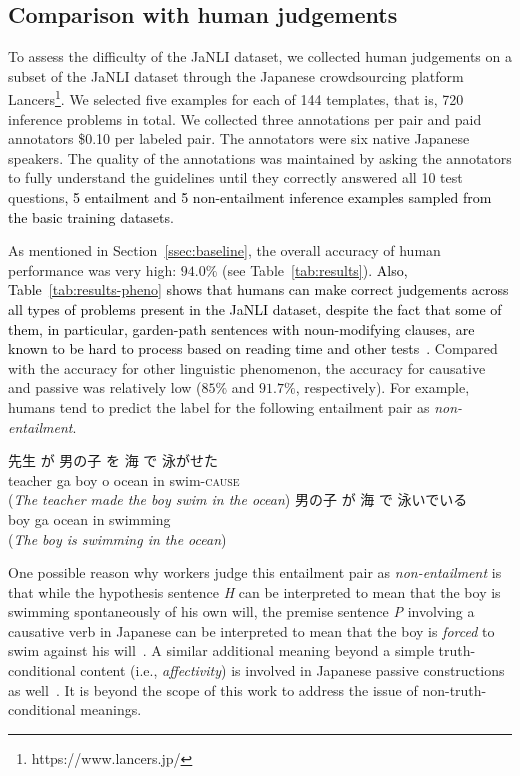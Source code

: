 \documentclass[11pt]{article}
\newcommand{\todo}[1]{\textcolor{black}{#1}}
\newcommand{\km}[1]{\textcolor{black}{#1}}
\begin{document}
\subsection{Comparison with human judgements}
\label{ssec:human}
To assess the difficulty of the JaNLI dataset, we collected human judgements on a subset of the JaNLI dataset through the Japanese crowdsourcing platform Lancers\footnote{https://www.lancers.jp/}.
We selected five examples for each of 144 templates, that is,
720 inference problems in total.
We collected three annotations per pair and paid annotators \$0.10 per labeled pair.
The annotators were six native Japanese speakers.
The quality of the annotations was maintained by asking the annotators to fully understand the guidelines until they correctly answered all 10 test questions\todo{, 5 entailment and 5 non-entailment inference examples sampled from the basic training datasets}.

As mentioned in Section~\ref{ssec:baseline}, the overall accuracy of human performance was very high: $94.0\%$ (see Table~\ref{tab:results}).
\km{Also, Table~\ref{tab:results-pheno} shows that humans can make correct judgements
across all types of problems present in the JaNLI dataset, 
despite the fact that some of them, in particular, garden-path sentences with noun-modifying clauses, are known to be hard to process based on reading time and other tests~\cite{miyamoto08}.}
Compared with the accuracy for other linguistic phenomenon, 
the accuracy for causative and passive was relatively low ($85\%$ and $91.7\%$, respectively).
For example, humans tend to predict the label for the following
entailment pair as \textit{non-entailment}.
\begin{exe}
\mbox{先生} \mbox{が} \mbox{男の子} \mbox{を} \mbox{海} \mbox{で} \mbox{泳がせた}\\
teacher ga boy o ocean in swim-\textsc{cause}\\
(\textit{The teacher made the boy swim in the ocean})
\medskip
{} \mbox{男の子} \mbox{が} \mbox{海} \mbox{で} \mbox{泳いでいる}\\
boy ga ocean in swimming\\
(\textit{The boy is swimming in the ocean})
\end{exe}
One possible reason why workers judge this entailment pair as \textit{non-entailment} is that while the hypothesis sentence \textit{H} can be interpreted
to mean that the boy is swimming spontaneously of his own will,
the premise sentence \textit{P} involving a causative verb in Japanese can be interpreted to mean that
the boy is \textit{forced} to swim against his will~\cite{kuroda65,tsujimura2013introduction}.
A similar additional meaning beyond a simple truth-conditional content
(i.e., \textit{affectivity}) is involved in Japanese passive constructions as well~\cite{kuno73,kuroda79}. It is beyond the scope of this work
to address the issue of non-truth-conditional meanings.
\end{document}
